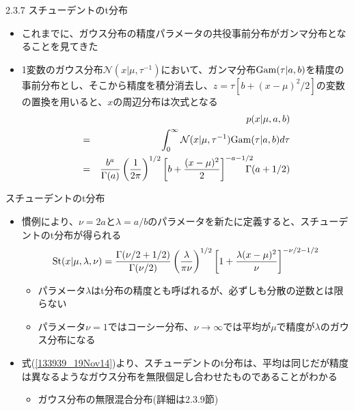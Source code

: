\begin{frame}{2.3.7 スチューデントのt分布}
 \begin{itemize}
  \item これまでに、ガウス分布の精度パラメータの共役事前分布がガンマ分布となることを見てきた
  \item 1変数のガウス分布$\mathcal{N}(x|\mu, \tau^{-1})$において、ガンマ分布${\rm Gam}(\tau|a,b)$を精度の事前分布とし、そこから精度を積分消去し、$z=\tau[b+(x-\mu)^2/2]$の変数の置換を用いると、$x$の周辺分布は次式となる
        \begin{eqnarray}
         && p(x|\mu,a,b) \nonumber \\
         &=& \int_0^\infty \mathcal{N}(x|\mu,\tau^{-1}){\rm Gam}(\tau|a,b)d\tau\label{133939_19Nov14} \\
         &= & \frac{b^a}{\Gamma(a)}\left(\frac{1}{2\pi}\right)^{1/2}\left[b+\frac{(x-\mu)^2}{2}\right]^{-a-1/2}\!\!\!\!\!\!\Gamma(a+1/2)
        \end{eqnarray}
 \end{itemize}
\end{frame}

\begin{frame}{スチューデントのt分布}
 \begin{itemize}
  \item 慣例により、$\nu=2a$と$\lambda=a/b$のパラメータを新たに定義すると、\alert{スチューデントのt分布}が得られる
        \begin{equation}
         {\rm St}(x|\mu,\lambda,\nu) = \frac{\Gamma(\nu/2+1/2)}{\Gamma(\nu/2)}\left(\frac{\lambda}{\pi\nu}\right)^{1/2}\left[1+\frac{\lambda(x-\mu)^2}{\nu}\right]^{-\nu/2-1/2}
        \end{equation}
        \begin{itemize}
         \item パラメータ$\lambda$はt分布の精度とも呼ばれるが、必ずしも分散の逆数とは限らない
         \item パラメータ$\nu=1$ではコーシー分布、$\nu\rightarrow\infty$では平均が$\mu$で精度が$\lambda$のガウス分布になる
        \end{itemize}
  \item 式(\ref{133939_19Nov14})より、スチューデントのt分布は、平均は同じだが精度は異なるようなガウス分布を無限個足し合わせたものであることがわかる
        \begin{itemize}
         \item ガウス分布の無限混合分布(詳細は2.3.9節)
        \end{itemize}
 \end{itemize}
\end{frame}

